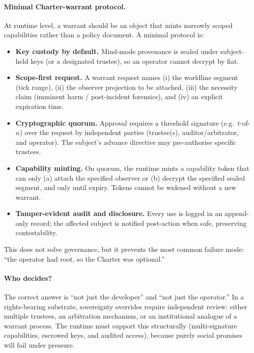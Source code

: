 \documentclass{aion}
\begin{document}
\paragraph{Minimal Charter-warrant protocol.}
At runtime level, a warrant should be an object that mints narrowly scoped capabilities rather than a policy document.
A minimal protocol is:

\begin{itemize}[leftmargin=*]
  \item \textbf{Key custody by default.}
    Mind-mode provenance is sealed under subject-held keys (or a designated trustee), so an operator cannot decrypt by fiat.
  \item \textbf{Scope-first request.}
    A warrant request names (i) the worldline segment (tick range), (ii) the observer projection to be attached, (iii) the necessity claim (imminent harm / post-incident forensics), and (iv) an explicit expiration time.
  \item \textbf{Cryptographic quorum.}
    Approval requires a threshold signature (e.g.\ $t$-of-$n$) over the request by independent parties (trustee(s), auditor/arbitrator, and operator).
    The subject's advance directive may pre-authorise specific trustees.
  \item \textbf{Capability minting.}
    On quorum, the runtime mints a capability token that can only (a) attach the specified observer or (b) decrypt the specified sealed segment, and only until expiry.
    Tokens cannot be widened without a new warrant.
  \item \textbf{Tamper-evident audit and disclosure.}
    Every use is logged in an append-only record; the affected subject is notified post-action when safe, preserving contestability.
\end{itemize}

This does not solve governance, but it prevents the most common failure mode: ``the operator had root, so the Charter was optional.''

\paragraph{Who decides?}
The correct answer is ``not just the developer'' and ``not just the operator.''
In a rights-bearing substrate, sovereignty overrides require independent review:
either multiple trustees, an arbitration mechanism, or an institutional analogue
of a warrant process.
The runtime must support this structurally (multi-signature capabilities,
escrowed keys, and audited access), because purely social promises will fail under
pressure.
\end{document}
